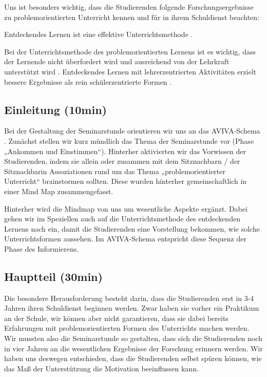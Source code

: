 \documentclass[man,12pt,a4paper]{apa6}
\begin{document}
Uns ist besonders wichtig, dass die Studierenden folgende Forschungsergebnisse zu problemorientierten Unterricht kennen und für in ihrem Schuldienst beachten:

\begin{APAitemize}
  \item Entdeckendes Lernen ist eine effektive Unterrichtsmethode \parencite{furtak2012}.
  \item Bei der Unterrichtsmethode des problemorientierten Lernens ist es wichtig, dass der Lernende nicht überfordert wird und ausreichend von der Lehrkraft unterstützt wird \parencite{kunter2013}. Entdeckendes Lernen mit lehrerzentrierten Aktivitäten erzielt bessere Ergebnisse als rein schülerzentrierte Formen \parencite{furtak2012}.
\end{APAitemize}

\subsection{Einleitung (10min)}

Bei der Gestaltung der Seminarstunde orientieren wir uns an das AVIVA-Schema \parencite{aviva}. Zunächst stellen wir kurz mündlich das Thema der Seminarstunde vor (Phase „Ankommen und Einstimmen“). Hinterher aktivierten wir das Vorwissen der Studierenden, indem sie allein oder zusammen mit dem Sitznachbarn / der Sitznachbarin Assoziationen rund um das Thema „problemorientierter Unterricht“ brainstormen sollten. Diese wurden hinterher gemeinschaftlich in einer Mind Map zusammengefasst.

Hinterher wird die Mindmap von uns um wesentliche Aspekte ergänzt. Dabei gehen wir im Speziellen auch auf die Unterrichtsmethode des entdeckenden Lernens nach \textcite{hameyer2008} ein, damit die Studierenden eine Vorstellung bekommen, wie solche Unterrichtsformen aussehen. Im AVIVA-Schema entspricht diese Sequenz der Phase des Informierens.

\subsection{Hauptteil (30min)}

Die besondere Herausforderung besteht darin, dass die Studierenden erst in 3-4 Jahren ihren Schuldienst beginnen werden. Zwar haben sie vorher ein Praktikum an der Schule, wir können aber nicht garantieren, dass sie dabei bereits Erfahrungen mit problemorientierten Formen des Unterrichts machen werden. Wir mussten also die Seminarstunde so gestalten, dass sich die Studierenden noch in vier Jahren an die wesentlichen Ergebnisse der Forschung erinnern werden. Wir haben uns deswegen entschieden, dass die Studierenden selbst spüren können, wie das Maß der Unterstützung die Motivation beeinflussen kann.
\end{document}
